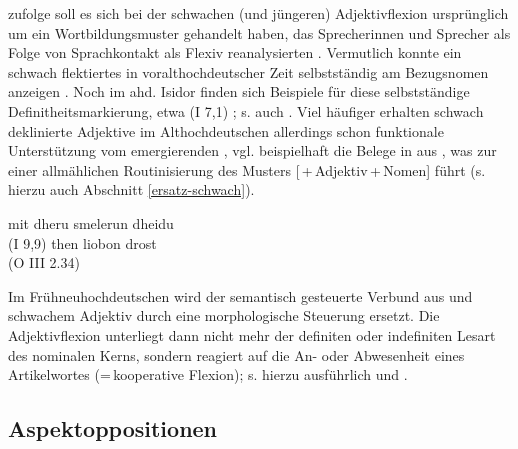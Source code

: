 \textcite[361--364]{Braunmuller2008} zufolge soll es sich bei der schwachen (und jüngeren) Adjektivflexion ursprünglich um ein Wortbildungsmuster gehandelt haben, das Sprecherinnen und Sprecher als Folge von Sprachkontakt als Flexiv reanalysierten  \parencite[zu alternativen Entstehungsszenarien s.][13--26]{Kovari1984}. Vermutlich konnte ein schwach flektiertes   in voralthochdeutscher Zeit selbstständig  am Bezugsnomen anzeigen 
\parencites()()[69]{Demske2001}[364]{Braunmuller2008}. Noch im ahd. Isidor finden sich Beispiele für diese selbstständige Definitheitsmarkierung,  etwa   (I 7,1) \parencite[226]{Braune2004}; s. auch \textcite[69--70]{Demske2001}. 
Viel häufiger erhalten schwach deklinierte Adjektive im Althochdeutschen allerdings schon funktionale Unterstützung vom emergierenden , vgl. beispielhaft die Belege in  aus \textcite[24,28]{Schrodt2004}, was zur einer allmählichen Routinisierung des Musters [\,+\,Adjektiv\,+\,Nomen] führt (s. hierzu auch Abschnitt \ref{ersatz-schwach}).

\begin{exe}
	\ex \label{ex:art-adj}   
	\begin{xlist}
		\ex \label{ex:art-adj1} mit dheru smelerun dheidu \\    (I 9,9) 
		\ex \label{ex:art-adj2} then liobon drost  \\  (O III 2.34)
		\end{xlist}
\end{exe}
 
Im Frühneuhochdeutschen wird der semantisch gesteuerte Verbund aus  und schwachem Adjektiv durch eine morphologische Steuerung ersetzt. Die Adjektivflexion unterliegt dann nicht mehr der definiten  oder indefiniten Lesart  des nominalen Kerns, sondern reagiert auf die An- oder Abwesenheit eines Artikelwortes  (=\,kooperative Flexion); s. hierzu ausführlich \textcite{Demske2001} und \textcite{Szczepaniak2011a}. 

\subsection{Aspektoppositionen} \label{sec:aspektoppo}

